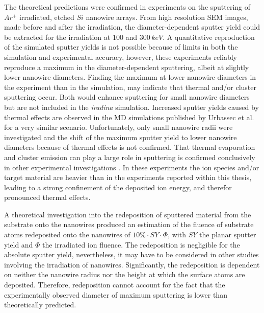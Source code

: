The theoretical predictions were confirmed in experiments on the sputtering of $Ar^+$ irradiated, etched $Si$ nanowire arrays. From high resolution SEM images, made before and after the irradiation, the diameter-dependent sputter yield could be extracted for the irradiation at $100$ and $300\,keV$. A quantitative reproduction of the simulated sputter yields is not possible because of limits in both the simulation and experimental accuracy, however, these experiments reliably reproduce a maximum in the diameter-dependent sputtering, albeit at slightly lower nanowire diameters. Finding the maximum at lower nanowire diameters in the experiment than in the simulation, may indicate that thermal and/or cluster sputtering occur. Both would enhance sputtering for small nanowire diameters but are not included in the \emph{iradina} simulation. Increased sputter yields caused by thermal effects are observed in the MD simulations published by Urbassec et al. \cite{urbassek_sputter_2015} for a very similar scenario. Unfortunately, only small nanowire radii were investigated and the shift of the maximum sputter yield to lower nanowire diameters because of thermal effects is not confirmed. That thermal evaporation and cluster emission can play a large role in sputtering is confirmed conclusively in other experimental investigations \cite{greaves_enhanced_2013,ilinov_sputtering_2014,anders_sputtering_2015,johannes_ion_2015}. In these experiments the ion species and/or target material are heavier than in the experiments reported within this thesis, leading to a strong confinement of the deposited ion energy, and therefor pronounced thermal effects.

A theoretical investigation into the redeposition of sputtered material from the substrate onto the nanowires produced an estimation of the fluence of substrate atoms redeposited onto the nanowires of $10\% \cdot SY \cdot \Phi$, with $ SY$ the planar sputter yield and $\Phi $ the irradiated ion fluence. The redeposition is negligible for the absolute sputter yield, nevertheless, it may have to be considered in other studies involving the irradiation of nanowires. Significantly, the redeposition is dependent on neither the nanowire radius nor the height at which the surface atoms are deposited. Therefore, redeposition cannot account for the fact that the experimentally observed diameter of maximum sputtering is lower than theoretically predicted.
